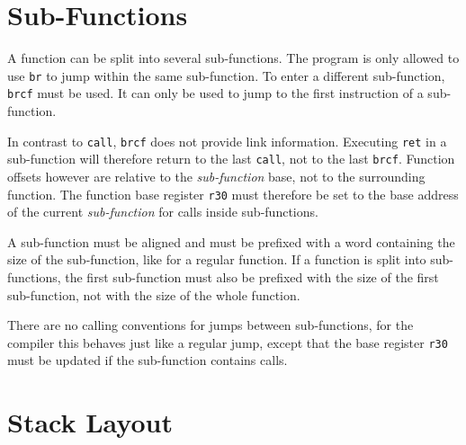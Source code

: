 \section{Sub-Functions}
A function can be split into several sub-functions. The program is only allowed to use
\texttt{br} to jump within the same sub-function. To enter a different sub-function,
\texttt{brcf} must be used. It can only be used to jump to the first instruction of a
sub-function.

In contrast to \texttt{call}, \texttt{brcf} does not provide link information.
Executing \texttt{ret} in a sub-function will therefore return to the last \texttt{call}, not to the last \texttt{brcf}.
Function offsets however are relative to the \emph{sub-function} base, not to the surrounding function.
The function base register \texttt{r30} must therefore be set to the base address
of the current \emph{sub-function} for calls inside sub-functions.

A sub-function must be aligned and must be prefixed with a word containing the size of the sub-function,
like for a regular function. If a function is split into sub-functions, the first sub-function
must also be prefixed with the size of the first sub-function, not with the size of the whole function.

There are no calling conventions for jumps between sub-functions, for the compiler
this behaves just like a regular jump, except that the base register \texttt{r30} must
be updated if the sub-function contains calls.






\section{Stack Layout}

